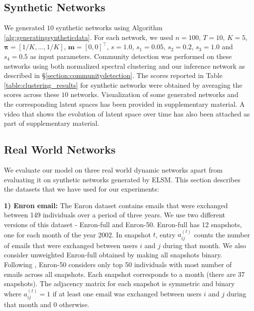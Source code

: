 \documentclass[letterpaper]{article} %
\begin{document}

\subsection{Synthetic Networks}
\label{section:generatingsyntheticnetworks}
We generated $10$ synthetic networks using Algorithm \ref{alg:generatingsyntheticdata}. For each network, we used $n=100$, $T=10$, $K=5$, $\mathbf{\pi}=[1/K, ..., 1/K]$, $\mathbf{m}=[0, 0]^\intercal$, $s=1.0$, $s_1=0.05$, $s_2=0.2$, $s_3=1.0$ and $s_4=0.5$ as input parameters. Community detection was performed on these networks using both normalized spectral clustering \cite{Luxburg:2007:ATutorialOnSpectralClustering} and our inference network as described in \S \ref{section:communitydetection}. The scores reported in Table \ref{table:clustering_results} for synthetic networks were obtained by averaging the scores across these $10$ networks. Visualization of some generated networks and the corresponding latent spaces has been provided in supplementary material. A video that shows the evolution of latent space over time has also been attached as part of supplementary material.


\subsection{Real World Networks}
\label{section:realworldnetworks}
We evaluate our model on three real world dynamic networks apart from evaluating it on synthetic networks generated by ELSM. This section describes the datasets that we have used for our experiments:

\textbf{1) Enron email:}
The Enron dataset \cite{KlimtEtAl:2004:TheEnronCorpus} contains emails that were exchanged between 149 individuals over a period of three years. We use two different versions of this dataset - Enron-full and Enron-50. Enron-full has 12 snapshots, one for each month of the year 2002. In snapshot ${t}$, entry ${a_{ij}^{(t)}}$ counts the number of emails that were exchanged between users ${i}$ and ${j}$ during that month. We also consider unweighted Enron-full obtained by making all snapshots binary. Following \cite{FouldsEtAl:2011:ADynamicRelationalInfiniteFeatureModelForLongitudinalSocialNetworks}, Enron-50 considers only top 50 individuals with most number of emails across all snapshots. Each snapshot corresponds to a month (there are 37 snapshots). The adjacency matrix for each snapshot is symmetric and binary where ${a_{ij}^{(t)}} = 1$ if at least one email was exchanged between users ${i}$ and ${j}$ during that month and $0$ otherwise.
\end{document}

